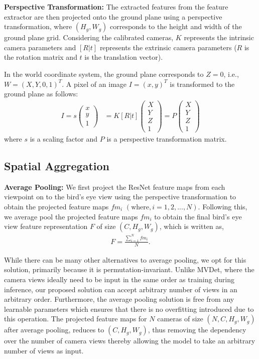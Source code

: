 \documentclass[letterpaper, 10 pt, conference]{ieeeconf}  \usepackage{times}
\begin{document}
\textbf{Perspective Transformation:} The extracted features from the feature extractor are then projected onto the ground plane using a perspective transformation, where $(H_g, W_g)$ corresponds to the height and width of the ground plane grid. Considering the calibrated cameras, \textbf{$K$} represents the intrinsic camera parameters and \textbf{$[R | t]$} represents the extrinsic camera parameters (\textbf{$R$} is the rotation matrix and \textbf{$t$} is the translation vector). 

In the world coordinate system, the ground plane corresponds to \textbf{$ Z = 0 $}, i.e., \textbf{$W = (X, Y, 0, 1)^T$}. A pixel of an image \textbf{$ I= (x,y)^T $} is transformed to the ground plane as follows:
\begin{align}
I = s \begin{pmatrix} x\\ y\\ 1\end{pmatrix} &= K[R|t]\begin{pmatrix} X\\ Y\\ Z\\ 1\end{pmatrix} = P \begin{pmatrix} X\\ Y\\ Z\\1\end{pmatrix}
\end{align}
where \textbf{$s$} is a scaling factor and \textbf{$P$} is a perspective transformation matrix.

\subsection{Spatial Aggregation}
\textbf{Average Pooling:} We first project the ResNet feature maps from each viewpoint on to the bird's eye view using the perspective transformation to obtain the projected feature maps $fm_{i}$ $(\text{where},  i = 1,2,..., N)$. 
Following this, we average pool the projected feature maps \textbf{$fm_{i}$}  to obtain the final bird's eye view feature representation $F$ of size $(C, H_g, W_g)$, which is written as,
\begin{align}
F = \frac{\sum_{i=1}^{N}fm_{i}}{N}.
\end{align}

While there can be many other alternatives to average pooling, we opt for this solution, primarily because it is permutation-invariant. Unlike MVDet, where the camera views ideally need to be input in the same order as training during inference, our proposed solution can accept arbitrary number of views in an arbitrary order. Furthermore, the average pooling solution is free from any learnable parameters which ensures that there is no overfitting introduced due to this operation.
The projected feature maps for $N$ cameras of size $(N, C, H_g, W_g)$ after average pooling, reduces to $(C, H_g, W_g)$, thus removing the dependency over the number of camera views thereby allowing the model to take an arbitrary number of views as input. 
\end{document}

